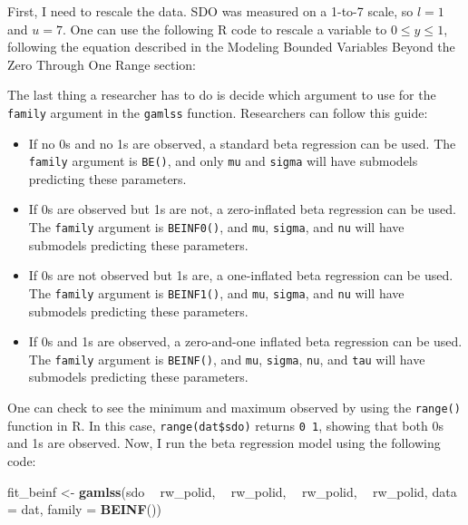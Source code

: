 \documentclass[english,man]{apa6}
\newenvironment{Shaded}{\begin{snugshade}}{\end{snugshade}}
\newcommand{\KeywordTok}[1]{\textcolor[rgb]{0.13,0.29,0.53}{\textbf{#1}}}
\newcommand{\DataTypeTok}[1]{\textcolor[rgb]{0.13,0.29,0.53}{#1}}
\newcommand{\StringTok}[1]{\textcolor[rgb]{0.31,0.60,0.02}{#1}}
\newcommand{\OperatorTok}[1]{\textcolor[rgb]{0.81,0.36,0.00}{\textbf{#1}}}
\newcommand{\NormalTok}[1]{#1}
\theoremstyle{definition}
\theoremstyle{definition}
\theoremstyle{remark}
\begin{document}
First, I need to rescale the data. SDO was measured on a 1-to-7 scale,
so \(l = 1\) and \(u = 7\). One can use the following R code to rescale
a variable to \(0 \leq y \leq 1\), following the equation described in
the Modeling Bounded Variables Beyond the Zero Through One Range
section:

The last thing a researcher has to do is decide which argument to use
for the \texttt{family} argument in the \texttt{gamlss} function.
Researchers can follow this guide:

\begin{itemize}
\item
  If no 0s and no 1s are observed, a standard beta regression can be
  used. The \texttt{family} argument is \texttt{BE()}, and only
  \texttt{mu} and \texttt{sigma} will have submodels predicting these
  parameters.
\item
  If 0s are observed but 1s are not, a zero-inflated beta regression can
  be used. The \texttt{family} argument is \texttt{BEINF0()}, and
  \texttt{mu}, \texttt{sigma}, and \texttt{nu} will have submodels
  predicting these parameters.
\item
  If 0s are not observed but 1s are, a one-inflated beta regression can
  be used. The \texttt{family} argument is \texttt{BEINF1()}, and
  \texttt{mu}, \texttt{sigma}, and \texttt{nu} will have submodels
  predicting these parameters.
\item
  If 0s and 1s are observed, a zero-and-one inflated beta regression can
  be used. The \texttt{family} argument is \texttt{BEINF()}, and
  \texttt{mu}, \texttt{sigma}, \texttt{nu}, and \texttt{tau} will have
  submodels predicting these parameters.
\end{itemize}

One can check to see the minimum and maximum observed by using the
\texttt{range()} function in R. In this case, \texttt{range(dat\$sdo)}
returns \texttt{0\ 1}, showing that both 0s and 1s are observed. Now, I
run the beta regression model using the following code:

\begin{Shaded}
\begin{Highlighting}[]
\NormalTok{fit_beinf <-}\StringTok{ }\KeywordTok{gamlss}\NormalTok{(sdo }\OperatorTok{~}\StringTok{ }\NormalTok{rw_polid, }\OperatorTok{~}\StringTok{ }\NormalTok{rw_polid, }\OperatorTok{~}\StringTok{ }\NormalTok{rw_polid, }\OperatorTok{~}\StringTok{ }\NormalTok{rw_polid,}
                    \DataTypeTok{data =}\NormalTok{ dat, }\DataTypeTok{family =} \KeywordTok{BEINF}\NormalTok{())}
\end{Highlighting}
\end{Shaded}
\end{document}
